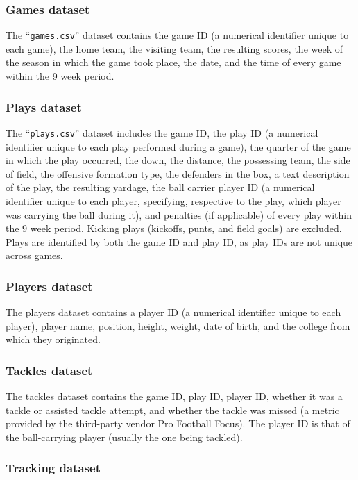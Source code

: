 \documentclass[bibtex, sigconf, hyperref={colorlinks=true,linkcolor=blue,urlcolor=blue}]{acmart}
\begin{document}
\subsubsection{Games dataset}

The ``\verb|games.csv|'' dataset contains the game ID (a numerical identifier unique to each game),
the home team, the visiting team, the resulting scores, the week of the season in which the game took
place, the date, and the time of every game within the 9 week period.

\subsubsection{Plays dataset}

The ``\verb|plays.csv|'' dataset includes the game ID, the play ID (a numerical identifier unique to
each play performed during a game), the quarter of the game in which the play occurred,
the down, the distance, the possessing team, the side of field, the offensive formation type,
the defenders in the box, a text description of the play, the resulting yardage,
the ball carrier player ID (a numerical identifier unique to each player, specifying, respective to the
play, which player was carrying the ball during it), and penalties (if
applicable) of every play within the 9 week period. Kicking plays (kickoffs,
punts, and field goals) are excluded. Plays are identified by both the game ID
and play ID, as play IDs are not unique across games.

\subsubsection{Players dataset}

The players dataset contains a player ID (a numerical identifier unique to each player),
player name, position, height, weight, date of birth, and the college from which they originated.

\subsubsection{Tackles dataset}

The tackles dataset contains the game ID, play ID, player ID, whether it was a
tackle or assisted tackle attempt, and whether the tackle was missed (a metric
provided by the third-party vendor Pro Football Focus). The player ID is that of the
ball-carrying player (usually the one being tackled).

\subsubsection{Tracking dataset}
\end{document}
